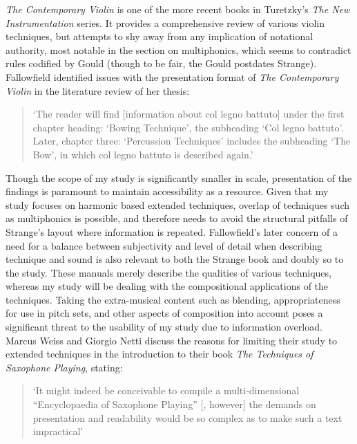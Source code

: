 \emph{The Contemporary Violin} is one of the more recent books in Turetzky’s \emph{The New Instrumentation} series. It provides a comprehensive review of various violin techniques, but attempts to shy away from any implication of notational authority, most notable in the section on multiphonics, which seems to contradict rules codified by Gould (though to be fair, the Gould postdates Strange).\autocites[134]{strangeContemporaryViolinExtended2001}[257-258]{gouldBars2011} Fallowfield identified issues with the presentation format of \emph{The Contemporary Violin} in the literature review of her thesis: 
\begin{quotation}
    ‘The reader will find [information about col legno battuto] under the first chapter heading: ‘Bowing Technique’, the subheading ‘Col legno battuto’. Later, chapter three: ‘Percussion Techniques’ includes the subheading ‘The Bow’, in which col legno battuto is described again.’\autocite[12]{fallowfieldCelloMapHandbook2009}
\end{quotation}
Though the scope of my study is significantly smaller in scale, presentation of the findings is paramount to maintain accessibility as a resource. Given that my study focuses on harmonic based extended techniques, overlap of techniques such as multiphonics is possible, and therefore needs to avoid the structural pitfalls of Strange’s layout where information is repeated. Fallowfield’s later concern of a need for a balance between subjectivity and level of detail when describing technique and sound is also relevant to both the Strange book and doubly so to the study. These manuals merely describe the qualities of various techniques, whereas my study will be dealing with the compositional applications of the techniques. Taking the extra-musical content such as blending, appropriateness for use in pitch sets, and other aspects of composition into account poses a significant threat to the usability of my study due to information overload. Marcus Weiss and Giorgio Netti discuss the reasons for limiting their study to extended techniques in the introduction to their book \emph{The Techniques of Saxophone Playing}, stating:
\begin{quotation}
    ‘It might indeed be conceivable to compile a multi-dimensional “Encyclopaedia of Saxophone Playing” [, however] the demands on presentation and readability would be so complex as to make such a text impractical’\autocite[Introduction]{weissTechniquesSaxophonePlaying2010}
\end{quotation}

